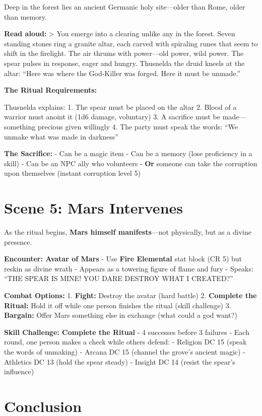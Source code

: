 \documentclass[
]{book}
\begin{document}
Deep in the forest lies an ancient Germanic holy site---older than Rome,
older than memory.

\textbf{Read aloud:} \textgreater{} You emerge into a clearing unlike
any in the forest. Seven standing stones ring a granite altar, each
carved with spiraling runes that seem to shift in the firelight. The air
thrums with power---old power, wild power. The spear pulses in response,
eager and hungry. Thusnelda the druid kneels at the altar: ``Here was
where the God-Killer was forged. Here it must be unmade.''

\textbf{The Ritual Requirements:}

Thusnelda explains: 1. The spear must be placed on the altar 2. Blood of
a warrior must anoint it (1d6 damage, voluntary) 3. A sacrifice must be
made---something precious given willingly 4. The party must speak the
words: ``We unmake what was made in darkness''

\textbf{The Sacrifice:} - Can be a magic item - Can be a memory (lose
proficiency in a skill) - Can be an NPC ally who volunteers -
\textbf{Or} someone can take the corruption upon themselves (instant
corruption level 5)

\section{Scene 5: Mars Intervenes}\label{scene-5-mars-intervenes}

As the ritual begins, \textbf{Mars himself manifests}---not physically,
but as a divine presence.

\textbf{Encounter: Avatar of Mars} - Use \textbf{Fire Elemental} stat
block (CR 5) but reskin as divine wrath - Appears as a towering figure
of flame and fury - Speaks: ``THE SPEAR IS MINE! YOU DARE DESTROY WHAT I
CREATED?''

\textbf{Combat Options:} 1. \textbf{Fight:} Destroy the avatar (hard
battle) 2. \textbf{Complete the Ritual:} Hold it off while one person
finishes the ritual (skill challenge) 3. \textbf{Bargain:} Offer Mars
something else in exchange (what could a god want?)

\textbf{Skill Challenge: Complete the Ritual} - 4 successes before 3
failures - Each round, one person makes a check while others defend: -
Religion DC 15 (speak the words of unmaking) - Arcana DC 15 (channel the
grove's ancient magic) - Athletics DC 13 (hold the spear steady) -
Insight DC 14 (resist the spear's influence)

\section{Conclusion}\label{conclusion-1}
\end{document}
